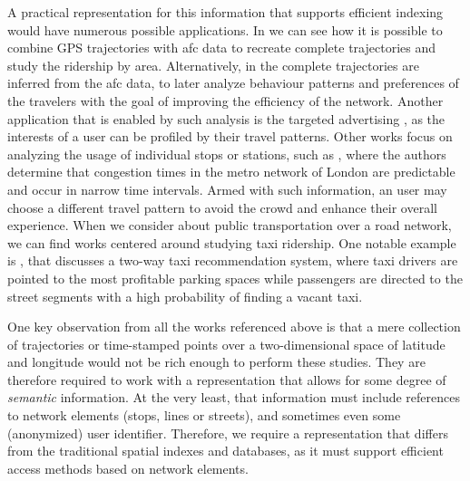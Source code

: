 \documentclass[a4paper,10pt,twoside]{book}
\begin{document}
	A practical representation for this information that supports efficient indexing would have numerous possible applications. In \cite{tu2018spatial} we can see how it is possible to combine GPS trajectories with \gls{afc} data to recreate complete trajectories and study the ridership by area. Alternatively, in \cite{weng2018mining} the complete trajectories are inferred from the \gls{afc} data, to later analyze behaviour patterns and preferences of the travelers with the goal of improving the efficiency of the network. Another application that is enabled by such analysis is the targeted advertising \cite{zhang2017targeted}, as the interests of a user can be profiled by their travel patterns. Other works focus on analyzing the usage of individual stops or stations, such as \cite{ceapa2012avoiding}, where the authors determine that congestion times in the metro network of London are predictable and occur in narrow time intervals. Armed with such information, an user may choose a different travel pattern to avoid the crowd and enhance their overall experience. When we consider about public transportation over a road network, we can find works centered around studying taxi ridership. One notable example is \cite{yuan2013t}, that discusses a two-way taxi recommendation system, where taxi drivers are pointed to the most profitable parking spaces while passengers are directed to the street segments with a high probability of finding a vacant taxi.
	
	One key observation from all the works referenced above is that a mere collection of trajectories or time-stamped points over a two-dimensional space of latitude and longitude would not be rich enough to perform these studies. They are therefore required to work with a representation that allows for some degree of \textit{semantic} information. At the very least, that information must include references to network elements (stops, lines or streets), and sometimes even some (anonymized) user identifier. Therefore, we require a representation that differs from the traditional spatial indexes and databases, as it must support efficient access methods based on network elements.
	
\end{document}
